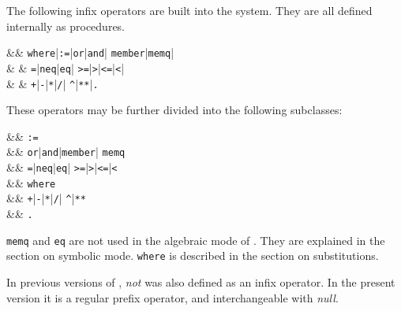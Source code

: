 The following infix operators are built into the
system.  They are all defined internally as procedures.
\begin{syntaxtable}
 &\BNFprod & \texttt{where}|\texttt{:=}|\texttt{or}|\texttt{and}|%
                                  \texttt{member}|\texttt{memq}|\\
                      &         & \texttt{=}|\texttt{neq}|\texttt{eq}|%
                                  \texttt{>=}|\texttt{>}|\texttt{<=}|\texttt{<}|\\
                      &         & \texttt{+}|\texttt{-}|\texttt{*}|\texttt{/}|%
                                  \texttt{\textasciicircum}|\texttt{**}|\texttt{.}
\end{syntaxtable}
These operators may be further divided into the following subclasses:
\begin{syntaxtable}
      &\BNFprod & \texttt{:=} \\
         &\BNFprod & \texttt{or}|\texttt{and}|\texttt{member}|%
                                            \texttt{memq} \\
      &\BNFprod & \texttt{=}|\texttt{neq}|\texttt{eq}|%
                                            \texttt{>=}|\texttt{>}|\texttt{<=}|\texttt{<}\\
    &\BNFprod & \texttt{where} \\
      &\BNFprod & \texttt{+}|\texttt{-}|\texttt{*}|\texttt{/}|%
                                            \texttt{\textasciicircum}|\texttt{**} \\
    &\BNFprod & \texttt{.}
\end{syntaxtable}
\texttt{memq} and \texttt{eq} are not used in the algebraic mode of
{\REDUCE}.  They are explained in the section on symbolic mode.
\texttt{where} is described in the section on substitutions.

In previous versions of {\REDUCE}, \emph{not} was also defined as an infix
operator.  In the present version it is a regular prefix operator, and
interchangeable with \emph{null}.


